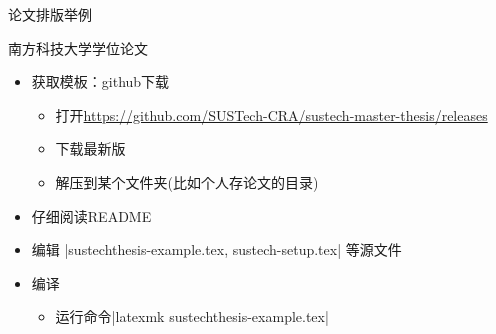 \begin{frame}[fragile]{论文排版举例}
	\begin{exampleblock}{南方科技大学学位论文}
		\begin{itemize}
			\item 获取模板：github下载
			      \begin{itemize}
				      \item 打开\url{https://github.com/SUSTech-CRA/sustech-master-thesis/releases}
				      \item 下载最新版
				      \item 解压到某个文件夹(比如个人存论文的目录)
			      \end{itemize}
			\item 仔细阅读README
			\item 编辑 |sustechthesis-example.tex, sustech-setup.tex| 等源文件 
			\item 编译
			      \begin{itemize}
				      \item 运行命令|latexmk sustechthesis-example.tex|
			      \end{itemize}
		\end{itemize}
	\end{exampleblock}
\end{frame}


